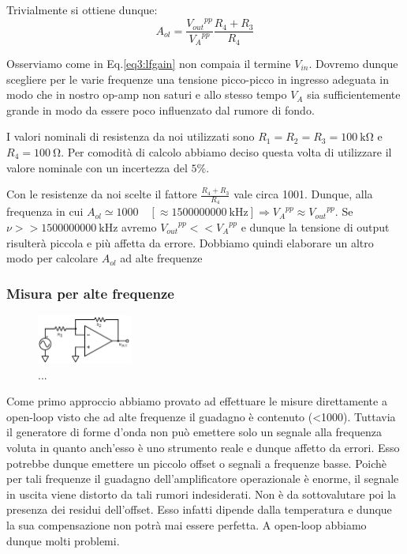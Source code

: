 Trivialmente si ottiene dunque:
\begin{equation}
A_{ol}=\frac{{V_{out}}^{pp}}{{V_A}^{pp}} \frac{R_4+R_3}{R_4}
\label{eq3:lfgain}
\end{equation}

Osserviamo come in Eq.\ref{eq3:lfgain} non compaia il termine $V_{in}$. Dovremo dunque scegliere per le varie frequenze una tensione picco-picco in ingresso adeguata in modo che in nostro op-amp non saturi e allo stesso tempo $V_A$ sia sufficientemente grande in modo da essere poco influenzato dal rumore di fondo. 

I valori nominali di resistenza da noi utilizzati sono $R_1=R_2=R_3=\SI{100}{\kilo\ohm}$ e $R_4=\SI{100}{\ohm}$. Per comodità di calcolo abbiamo deciso questa volta di utilizzare il valore nominale con un incertezza del $5\%$. 

Con le resistenze da noi scelte il fattore $\frac{R_4+R_3}{R_4}$ vale circa 1001. Dunque, alla frequenza in cui $A_{ol} \simeq 1000 \quad [\approx\SI{1500000000}{\kilo\hertz}] \Rightarrow {V_A}^{pp} \approx {V_{out}}^{pp}$. Se $\nu >> \SI{1500000000}{\kilo\hertz}$ avremo ${V_{out}}^{pp}<<{V_A}^{pp}$ e dunque la tensione di output risulterà piccola e più affetta da errore. Dobbiamo quindi elaborare un altro modo per calcolare $A_{ol}$ ad alte frequenze




\subsubsection{Misura per alte frequenze}

\begin{figure}
  \begin{center}
    \includegraphics[width=0.280\textwidth]{../E03/latex/HF_ol.pdf}
  \end{center}
  \caption{...}
  \label{cir3:high_frequency}
\end{figure}

Come primo approccio abbiamo provato ad effettuare le misure direttamente a open-loop visto che ad alte frequenze il guadagno è contenuto (<1000). Tuttavia il generatore di forme d'onda non può emettere solo un segnale alla frequenza voluta in quanto anch'esso è uno strumento reale e dunque affetto da errori. Esso potrebbe dunque emettere un piccolo offset o segnali a frequenze basse. Poichè per tali frequenze il guadagno dell'amplificatore operazionale è enorme, il segnale in uscita viene distorto da tali rumori indesiderati. Non è da sottovalutare poi la presenza dei residui dell'offset. Esso infatti dipende dalla temperatura e dunque la sua compensazione non potrà mai essere perfetta. A open-loop abbiamo dunque molti problemi. 


